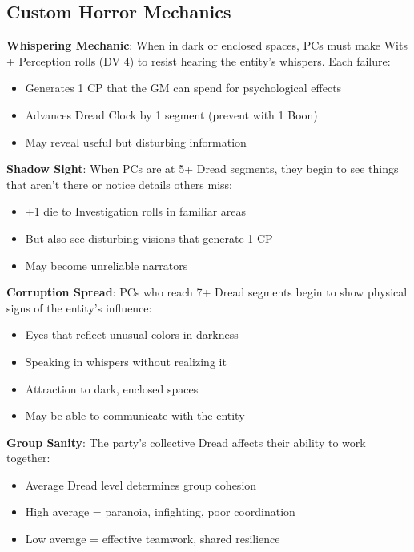 \documentclass[11pt]{article}
\begin{document}
\subsection*{Custom Horror Mechanics}

\begin{mdframed}[backgroundcolor=sanitybg]
\textbf{Whispering Mechanic}: When in dark or enclosed spaces, PCs must make Wits + Perception rolls (DV 4) to resist hearing the entity's whispers. Each failure:
\begin{itemize}[leftmargin=*]
\item Generates 1 CP that the GM can spend for psychological effects
\item Advances Dread Clock by 1 segment (prevent with 1 Boon)
\item May reveal useful but disturbing information
\end{itemize}

\textbf{Shadow Sight}: When PCs are at 5+ Dread segments, they begin to see things that aren't there or notice details others miss:
\begin{itemize}[leftmargin=*]
\item +1 die to Investigation rolls in familiar areas
\item But also see disturbing visions that generate 1 CP
\item May become unreliable narrators
\end{itemize}

\textbf{Corruption Spread}: PCs who reach 7+ Dread segments begin to show physical signs of the entity's influence:
\begin{itemize}[leftmargin=*]
\item Eyes that reflect unusual colors in darkness
\item Speaking in whispers without realizing it
\item Attraction to dark, enclosed spaces
\item May be able to communicate with the entity
\end{itemize}

\textbf{Group Sanity}: The party's collective Dread affects their ability to work together:
\begin{itemize}[leftmargin=*]
\item Average Dread level determines group cohesion
\item High average = paranoia, infighting, poor coordination
\item Low average = effective teamwork, shared resilience
\end{itemize}
\end{mdframed}
\end{document}

